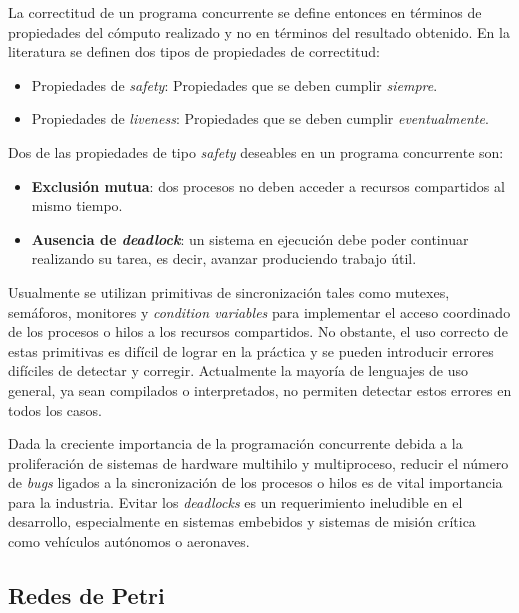 \documentclass[12pt]{article}
\begin{document}
La correctitud de un programa concurrente se define entonces en términos de propiedades del cómputo realizado y no en términos del
resultado obtenido. En la literatura se definen dos tipos de propiedades de correctitud\cite{ben-ari2006}\cite{coulouris2012}\cite{tanenbaum2017}:

\begin{itemize}
    \item Propiedades de \textit{safety}: Propiedades que se deben cumplir \textit{siempre}.
    \item Propiedades de \textit{liveness}: Propiedades que se deben cumplir \textit{eventualmente}.
\end{itemize}

Dos de las propiedades de tipo \textit{safety} deseables en un programa concurrente son:

\begin{itemize}
    \item \textbf{Exclusión mutua}: dos procesos no deben acceder a recursos compartidos al mismo tiempo.
    \item \textbf{Ausencia de \textit{deadlock}}: un sistema en ejecución debe poder continuar realizando su tarea, es decir, avanzar produciendo trabajo útil.
\end{itemize}

Usualmente se utilizan primitivas de sincronización tales como mutexes, semáforos, monitores y \textit{condition variables}
para implementar el acceso coordinado de los procesos o hilos a los recursos compartidos.
No obstante, el uso correcto de estas primitivas es difícil de lograr en la práctica y se pueden introducir errores difíciles de detectar y corregir.
Actualmente la mayoría de lenguajes de uso general, ya sean compilados o interpretados, no permiten detectar estos errores en todos los casos.

Dada la creciente importancia de la programación concurrente debida a la proliferación de sistemas de hardware multihilo y multiproceso,
reducir el número de \textit{bugs} ligados a la sincronización de los procesos o hilos es de vital importancia para la industria.
Evitar los \textit{deadlocks} es un requerimiento ineludible en el desarrollo, especialmente en sistemas embebidos y sistemas de misión crítica como vehículos autónomos o aeronaves.

\subsection{Redes de Petri}
\end{document}
